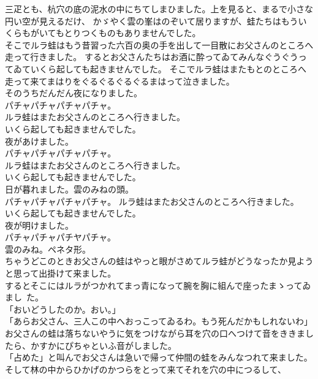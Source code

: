 \documentclass[
a4paper,
10pt,
book]
{tarticle}
\begin{document}
\indent 三疋とも、杭穴の底の泥水の中にちてしまひました。上を見ると、まるで小さな円い空が見えるだけ、
かゞやく雲の峯はのぞいて居りますが、蛙たちはもういくらもがいてもとりつくものもありませんでした。\\
\indent そこでルラ蛙はもう昔習った六百の奥の手を出して一目散にお父さんのところへ走って行きました。
するとお父さんたちはお酒に酔ってゐてみんなぐうぐうってゐていくら起しても起きませんでした。
そこでルラ蛙はまたもとのところへ走って来てまはりをぐるぐるぐるぐるまはって泣きました。\\
\indent そのうちだんだん夜になりました。\\
\indent \indent \indent \indent パチャパチャパチャパチャ。\\
\indent ルラ蛙はまたお父さんのところへ行きました。\\
\indent いくら起しても起きませんでした。\\
\indent 夜があけました。\\
\indent \indent \indent \indent パチャパチャパチャパチャ。\\
\indent ルラ蛙はまたお父さんのところへ行きました。\\
\indent いくら起しても起きませんでした。\\
\indent 日が暮れました。雲のみねの頭。\\
\indent \indent \indent \indent パチャパチャパチャパチャ。
\indent ルラ蛙はまたお父さんのところへ行きました。\\
\indent いくら起しても起きませんでした。\\
\indent 夜が明けました。\\
\indent \indent \indent \indent パチャパチャパチヤパチャ。\\
\indent 雲のみね。ペネタ形。\\
\indent ちゃうどこのときお父さんの蛙はやっと眼がさめてルラ蛙がどうなったか見ようと思って出掛けて来ました。\\
\indent するとそこにはルラがつかれてまっ青になって腕を胸に組んで座ったまゝってゐまし~た。\\
「おいどうしたのか。おい。」\\
「あらお父さん、三人この中へおっこってゐるわ。もう死んだかもしれないわ」\\
\indent お父さんの蛙は落ちないやうに気をつけながら耳を穴の口へつけて音をききましたら、かすかにぴちゃといふ音がしました。\\
「占めた」と叫んでお父さんは急いで帰って仲間の蛙をみんなつれて来ました。そして林の中からひかげのかつらをとって来てそれを穴の中につるして、
\end{document}
